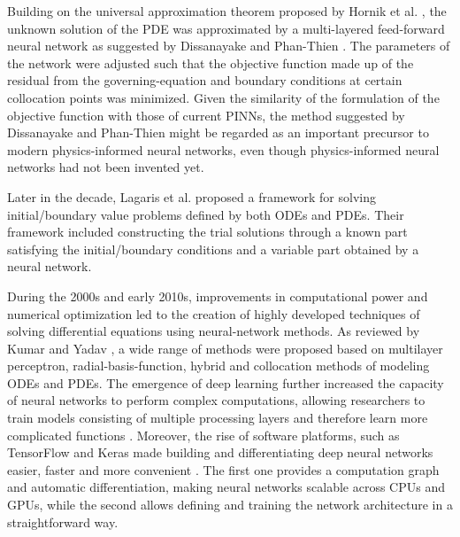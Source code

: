 \documentclass[11pt]{article}
\begin{document}
Building on the universal approximation theorem proposed by Hornik et al. \cite{hornikMultilayerFeedforwardNetworks1989}, the unknown solution of the PDE was approximated by a multi-layered feed-forward neural network as suggested by Dissanayake and Phan-Thien \cite{dissanayakeNeuralnetworkbasedApproximationsSolving1994}. The parameters of the network were adjusted such that the objective function made up of the residual from the governing-equation and boundary conditions at certain collocation points was minimized. Given the similarity of the formulation of the objective function with those of current PINNs, the method suggested by Dissanayake and Phan-Thien might be regarded as an important precursor to modern physics-informed neural networks, even though physics-informed neural networks had not been invented yet.

Later in the decade, Lagaris et al. \cite{lagarisArtificialNeuralNetworks1998} proposed a framework for solving initial/boundary value problems defined by both ODEs and PDEs. Their framework included constructing the trial solutions through a known part satisfying the initial/boundary conditions and a variable part obtained by a neural network.

During the 2000s and early 2010s, improvements in computational power and numerical optimization led to the creation of highly developed techniques of solving differential equations using neural-network methods. As reviewed by Kumar and Yadav \cite{kumarMultilayerPerceptronsRadial2011} , a wide range of methods were proposed based on multilayer perceptron, radial-basis-function, hybrid and collocation methods of modeling ODEs and PDEs. The emergence of deep learning further increased the capacity of neural networks to perform complex computations, allowing researchers to train models consisting of multiple processing layers and therefore learn more complicated functions \cite{lecunDeepLearning2015}. Moreover, the rise of software platforms, such as TensorFlow and Keras made building and differentiating deep neural networks easier, faster and more convenient \cite{abadi2016tensorflow, ketkar2017introduction}. The first one provides a computation graph and automatic differentiation, making neural networks scalable across CPUs and GPUs, while the second allows defining and training the network architecture in a straightforward way.
\end{document}
